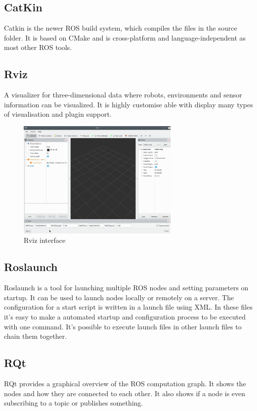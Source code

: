 \subsection{CatKin}
Catkin is the newer ROS build system, which compiles the files in the source folder. It is based on CMake and is cross-platform and language-independent as most other ROS tools.

\subsection{Rviz}
A visualizer for three-dimensional data where robots, environments and sensor information can be visualized. It is highly customise able with display many types of visualisation and plugin support. \\
\begin{figure}[H]
	\centering
	\includegraphics[width=0.7\textwidth]{./media/images/rviz}
  	\caption{Rviz interface}
  	\label{htl01}
\end{figure}

\subsection{Roslaunch}
Roslaunch is a tool for launching multiple ROS nodes and setting parameters on startup. It can be used to launch nodes locally or remotely on a server.
The configuration for a start script is written in a launch file using XML. In these files it's easy to make a automated startup and configuration process to be executed with one command. It's possible to execute launch files in other launch files to chain them together.

\subsection{RQt}
RQt provides a graphical overview of the ROS computation graph. It shows the nodes and how they are connected to each other. It also shows if a node is even subscribing to a topic or publishes something.